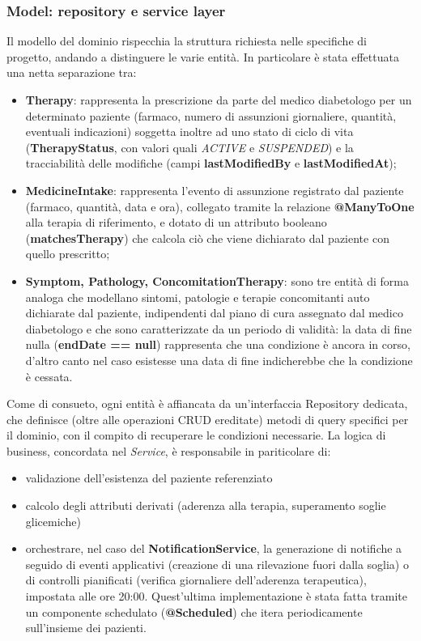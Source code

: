 \documentclass{article}
\begin{document}
\subsubsection{Model: repository e service layer}
Il modello del dominio rispecchia la struttura richiesta nelle specifiche di progetto, andando a distinguere le varie entità.
In particolare è stata effettuata una netta separazione tra:
\begin{itemize}
   \item \textbf{Therapy}: rappresenta la prescrizione da parte del medico diabetologo per un determinato paziente (farmaco, numero di assunzioni giornaliere, quantità, eventuali indicazioni)
       soggetta inoltre ad uno stato di ciclo di vita (\textbf{TherapyStatus}, con valori quali \textit{ACTIVE} e \textit{SUSPENDED}) e la tracciabilità delle modifiche (campi \textbf{lastModifiedBy} e \textbf{lastModifiedAt});
   \item \textbf{MedicineIntake}: rappresenta l'evento di assunzione registrato dal paziente (farmaco, quantità, data e ora), collegato tramite la relazione \textbf{@ManyToOne} alla terapia di riferimento, e dotato di un attributo
       booleano (\textbf{matchesTherapy}) che calcola ciò che viene dichiarato dal paziente con quello prescritto;
   \item \textbf{Symptom, Pathology, ConcomitationTherapy}: sono tre entità di forma analoga che modellano sintomi, patologie e terapie concomitanti auto dichiarate dal paziente,
       indipendenti dal piano di cura assegnato dal medico diabetologo e che sono caratterizzate da un periodo di validità: la data di fine nulla (\textbf{endDate == null}) rappresenta che
       una condizione è ancora in corso, d'altro canto nel caso esistesse una data di fine indicherebbe che la condizione è cessata.
\end{itemize}
Come di consueto, ogni entità è affiancata da un'interfaccia Repository dedicata, che definisce (oltre alle operazioni CRUD ereditate) metodi di query specifici per il dominio, con il compito di recuperare le condizioni necessarie.
La logica di business, concordata nel \textit{Service}, è responsabile in pariticolare di:
\begin{itemize}
   \item validazione dell'esistenza del paziente referenziato
   \item calcolo degli attributi derivati (aderenza alla terapia, superamento soglie glicemiche)
   \item orchestrare, nel caso del \textbf{NotificationService}, la generazione di notifiche a seguido di eventi applicativi
       (creazione di una rilevazione fuori dalla soglia) o di controlli pianificati (verifica giornaliere dell'aderenza terapeutica), impostata alle ore 20:00.
       Quest'ultima implementazione è stata fatta tramite un componente schedulato (\textbf{@Scheduled}) che itera periodicamente
       sull'insieme dei pazienti.
\end{itemize}
\end{document}
